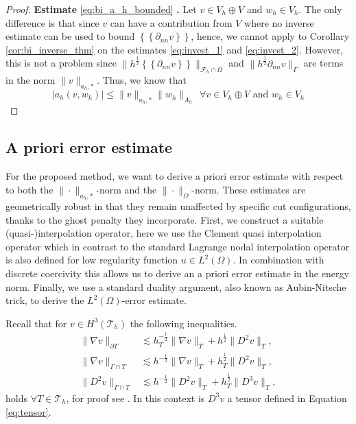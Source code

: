 \documentclass[11pt]{article}
\theoremstyle{remark}
\newcommand{\mean}[1]{\left\{\!\!\left\{#1\right\}\!\!\right\}}
\newcommand{\abs}[1]{\left\lvert #1 \right\rvert}
\renewcommand{\le}{\leqslant}
\numberwithin{equation}{section}
\begin{document}
\begin{proof}
             \textbf{Estimate }\eqref{eq:bi_a_h_bounded} \textbf{.} Let $v \in V_{h} \oplus V $ and $w_{h} \in V_{h}$.
             The only difference is that since $v$ can have a contribution from $V$ where no inverse estimate can be used to bound $\mean{ \partial _{nn} v }  $, hence, we cannot apply to Corollary \ref{cor:bi_inverse_thm} on the estimates \eqref{eq:invest_1} and \eqref{eq:invest_2}. However, this is not a problem since $\| h^{\frac{1}{2}} \mean{ \partial _{nn} v }
             \|_{\mathcal{F} _{h}\cap  \Omega   }^{  } $ and  $\|h^{\frac{1}{2}}  \partial _{nn}v \|_{\Gamma   }^{  } $ are terms in the norm $\|  v \|_{a_{h},*  }^{  } $. Thus, we know that
             \begin{equation}
                  \abs{ a_{h}( v,w_{h}) }  \le \| v \|_{ a_{h},* }^{  } \| w_{h} \|_{ A_{h} }^{  } \ \ \forall v \in V_{h} \oplus V \text{ and } w_{h} \in V_{h}
             \end{equation}

\end{proof}




\subsection{A priori error estimate}%
\label{sec:a_priori_estimates}


For the proposed method, we want to derive a priori error estimate with respect to both the  $\| \cdot  \|_{a_{h},*   }^{  } $-norm and the  $\| \cdot  \|_{ \Omega  }^{
} $-norm.  These estimates are geometrically robust in that they remain unaffected by specific cut configurations, thanks to the ghost penalty they incorporate.
First, we construct a suitable (quasi-)interpolation operator, here we use the Clement quasi interpolation operator which in contrast to the standard Lagrange nodal interpolation operator is also defined for low regularity function $u \in L^{2}(
\Omega ) $.
In combination with discrete coercivity this allows us to derive an a priori error estimate in the energy norm. Finally, we use a standard duality argument, also known as Aubin-Nitsche trick, to derive the $L^{2}( \Omega ) $-error estimate.

Recall that for $v \in H^{3}( \mathcal{T } _{h}) $ the following inequalities.
\begin{align}
    \label{eq:trace:1}
    \| \nabla v \|_{ \partial T }^{  } &\lesssim h^{-\frac{1}{2}}_{T}\|  \nabla v \|_{ T }^{  }+ h^{\frac{1}{2}} \| D^2 v \|_{T  }^{   }  , \\
    \label{eq:trace:2}
    \| \nabla v \|_{ \Gamma \cap T }^{  } &\lesssim  h^{-\frac{1}{2}} \| \nabla v \|_{T  }^{  }   + h^{\frac{1}{2}}_{T} \| D^2 v \|_{ T }^{  },\\
    \label{eq:trace:3}
    \| D^2 v \|_{ \Gamma \cap T }^{  } &\lesssim  h^{-\frac{1}{2}} \| D^2 v \|_{T  }^{  }   + h^{\frac{1}{2}}_{T} \| D^3 v \|_{ T }^{  },
\end{align}
holds $\forall T \in \mathcal{T} _{h}$, for proof see \cite[Lemma 4.2]{hansbo2003finite}. In this context is $D^3v$ a tensor defined in Equation \eqref{eq:tensor}.
\end{document}
